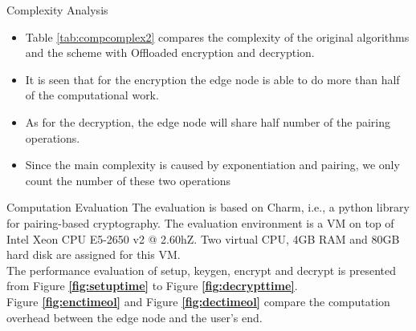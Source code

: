 \documentclass[11pt]{beamer}
\begin{document}
\begin{frame}[allowframebreaks]{Complexity Analysis}
\begin{itemize}
\item Table \ref{tab:compcomplex2} compares the complexity of the original algorithms and the scheme with Offloaded encryption and decryption.
\item It is seen that for the encryption the edge node is able to do more than half of the computational work.
\item As for the decryption, the edge node will share half number of the pairing operations.
\item Since the main complexity is caused by exponentiation and pairing, we only count the number of these two operations
\end{itemize}

\end{frame}

\begin{frame}{Computation Evaluation}
The evaluation is based on Charm, i.e., a python library for pairing-based cryptography. The evaluation environment is a VM on top of Intel Xeon CPU E5-2650 v2 @ 2.60hZ. Two virtual CPU, 4GB RAM and 80GB hard disk are assigned for this VM.\\
The performance evaluation of setup, keygen, encrypt and decrypt is presented from Figure \textbf{\ref{fig:setuptime}} to Figure \textbf{\ref{fig:decrypttime}}.\\
Figure \textbf{\ref{fig:enctimeol}} and Figure \textbf{\ref{fig:dectimeol}} compare the computation overhead between the edge node and the user's end.

\end{frame}
\end{document}
